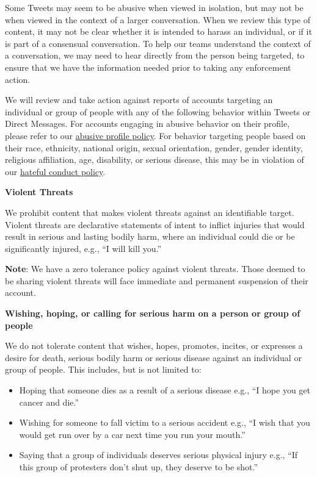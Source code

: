 Some Tweets may seem to be abusive when viewed in isolation, but may not be when
viewed in the context of a larger conversation. When we review this type of
content, it may not be clear whether it is intended to harass an individual, or
if it is part of a consensual conversation. To help our teams understand the
context of a conversation, we may need to hear directly from the person being
targeted, to ensure that we have the information needed prior to taking any
enforcement action.

We will review and take action against reports of accounts targeting an
individual or group of people with any of the following behavior within Tweets
or Direct Messages. For accounts engaging in abusive behavior on their profile,
please refer to our
\href{https://web.archive.org/web/20220905021323/https://help.twitter.com/en/rules-and-policies/abusive-profile.html}{abusive
profile policy}. For behavior targeting people based on their race, ethnicity,
national origin, sexual orientation, gender, gender identity, religious
affiliation, age, disability, or serious disease, this may be in violation of
our
\href{https://web.archive.org/web/20220905021323/https://help.twitter.com/en/rules-and-policies/hateful-conduct-policy.html}{hateful
conduct policy}.


\vspace{.5em}\noindent\textbf{Violent Threats}

\noindent We prohibit content that makes violent threats against an identifiable
target. Violent threats are declarative statements of intent to inflict injuries
that would result in serious and lasting bodily harm, where an individual could
die or be significantly injured, e.g., ``I will kill you.''

\textbf{Note}: We have a zero tolerance policy against violent threats. Those
deemed to be sharing violent threats will face immediate and permanent
suspension of their account.


\vspace{.5em}\noindent\textbf{Wishing, hoping, or calling for serious harm on a
    person or group of people}

\noindent We do not tolerate content that wishes, hopes, promotes, incites, or
expresses a desire for death, serious bodily harm or serious disease against an
individual or group of people. This includes, but is not limited to:

\begin{itemize}
\item Hoping that someone dies as a result of a serious disease e.g., ``I
    hope you get cancer and die.''
\item Wishing for someone to fall victim to a serious accident e.g., ``I
    wish that you would get run over by a car next time you run your
    mouth.''
\item Saying that a group of individuals deserves serious physical injury
    e.g., ``If this group of protesters don't shut up, they deserve to be
    shot.''
\end{itemize}


